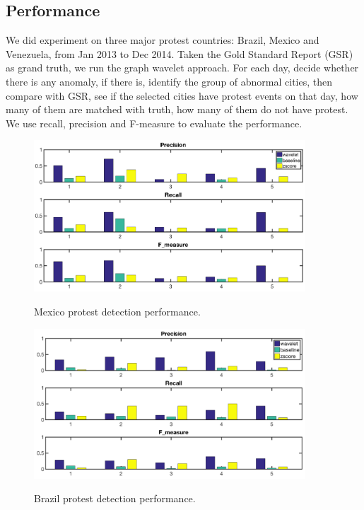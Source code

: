 \subsection{Performance}
We did experiment on three major protest countries: Brazil, Mexico and Venezuela, from Jan 2013 to Dec 2014. Taken the Gold Standard Report (GSR) as grand truth, we run the graph wavelet approach. For each day, decide whether there is any anomaly, if there is, identify the group of abnormal cities, then compare with GSR, see if the selected cities have protest events on that day, how many of them are matched with truth, how many of them do not have protest. We use recall, precision and F-measure to evaluate the performance.



\begin{figure}[h]
	\centering
    {
		\includegraphics[width= 4in] {figures/performance_compare_bar_graph_mexico.png}
		\label{fig:distribution2}
	}
	\caption{Mexico protest detection performance.}
	\label{Mexico_performance}
\end{figure}



\begin{figure}[h]
	\centering
    {
		\includegraphics[width= 4in] {figures/performance_compare_bar_graph_brazil.png}
		\label{fig:distribution2}
	}
	\caption{Brazil protest detection performance.}
	\label{Brazil_performance}
\end{figure}


